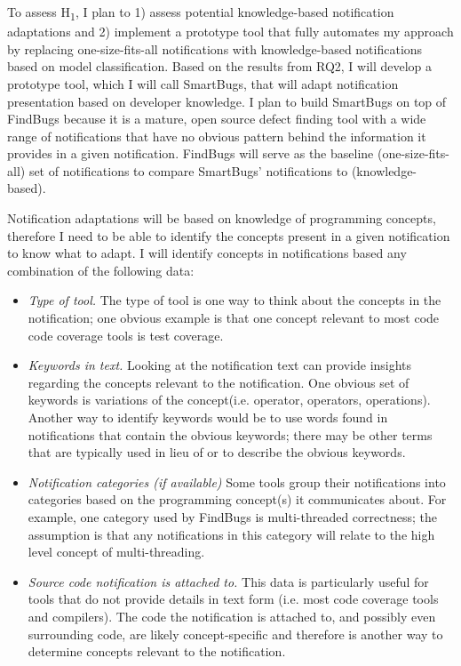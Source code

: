 \documentclass{llncs}
\begin{document}
 

To assess H\textsubscript{1}, I plan to 1) assess potential knowledge-based notification adaptations and 2) implement a prototype tool that fully automates my approach by replacing one-size-fits-all notifications with knowledge-based notifications based on model classification.
Based on the results from RQ2, I will develop a prototype tool, which I will call SmartBugs, that will adapt notification presentation based on developer knowledge. I plan to build SmartBugs on top of FindBugs because it is a mature, open source defect finding tool with a wide range of notifications that have no obvious pattern behind the information it provides in a given notification. FindBugs will serve as the baseline (one-size-fits-all) set of notifications to compare SmartBugs' notifications to (knowledge-based).

Notification adaptations will be based on knowledge of programming concepts, therefore I need to be able to identify the concepts present in a given notification to know what to adapt. 
I will identify concepts in notifications based any combination of the following data:
\begin{itemize}
	\item \textit{Type of tool.} The type of tool is one way to think about the concepts in the notification; one obvious example is that one concept relevant to most code code coverage tools is test coverage.
	\item \textit{Keywords in text.} Looking at the notification text can provide insights regarding the concepts relevant to the notification. One obvious set of keywords is variations of the concept(i.e. operator, operators, operations). Another way to identify keywords would be to use words found in notifications that contain the obvious keywords; there may be other terms that are typically used in lieu of or to describe the obvious keywords.
	\item \textit{Notification categories (if available)} Some tools group their notifications into categories based on the programming concept(s) it communicates about. For example, one category used by FindBugs is multi-threaded correctness; the assumption is that any notifications in this category will relate to the high level concept of multi-threading.
	\item \textit{Source code notification is attached to.} This data is particularly useful for tools that do not provide details in text form (i.e. most code coverage tools and compilers). The code the notification is attached to, and possibly even surrounding code, are likely concept-specific and therefore is another way to determine concepts relevant to the notification.
\end{itemize}
\end{document}
